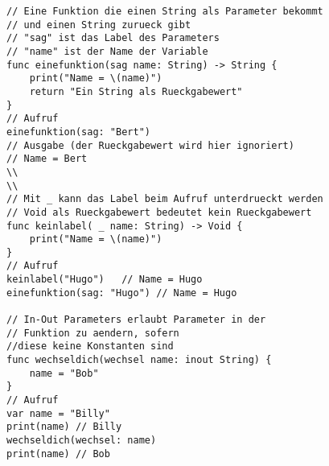 \begin{lstlisting}
// Eine Funktion die einen String als Parameter bekommt
// und einen String zurueck gibt
// "sag" ist das Label des Parameters
// "name" ist der Name der Variable
func einefunktion(sag name: String) -> String {
	print("Name = \(name)")
	return "Ein String als Rueckgabewert"
}
// Aufruf
einefunktion(sag: "Bert")
// Ausgabe (der Rueckgabewert wird hier ignoriert)
// Name = Bert
\\
\\
// Mit _ kann das Label beim Aufruf unterdrueckt werden
// Void als Rueckgabewert bedeutet kein Rueckgabewert
func keinlabel( _ name: String) -> Void {
	print("Name = \(name)")
}
// Aufruf
keinlabel("Hugo") 	// Name = Hugo
einefunktion(sag: "Hugo") // Name = Hugo

// In-Out Parameters erlaubt Parameter in der
// Funktion zu aendern, sofern 
//diese keine Konstanten sind
func wechseldich(wechsel name: inout String) {
	name = "Bob"
}
// Aufruf
var name = "Billy"
print(name) // Billy
wechseldich(wechsel: name)
print(name) // Bob
\end{lstlisting}

